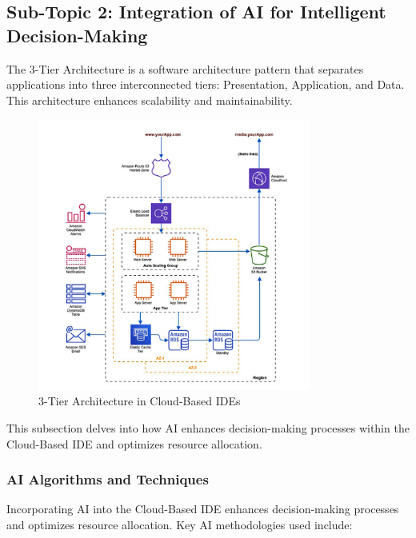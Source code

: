 \documentclass[12pt,a4paper,final]{report}
\begin{document}
\subsection{Sub-Topic 2: Integration of AI for Intelligent Decision-Making}


\hspace{1cm}
The 3-Tier Architecture is a software architecture pattern that separates applications into three interconnected tiers: Presentation, Application, and Data. This architecture enhances scalability and maintainability.

\begin{figure}[h] %
    \centering
    \includegraphics[width=0.8\textwidth]{3tier.png} %
    \caption{3-Tier Architecture in Cloud-Based IDEs}
    \label{fig:3tier}
\end{figure}


This subsection delves into how AI enhances decision-making processes within the Cloud-Based IDE and optimizes resource allocation.

\subsubsection{AI Algorithms and Techniques}

Incorporating AI into the Cloud-Based IDE enhances decision-making processes and optimizes resource allocation. Key AI methodologies used include:
\end{document}
